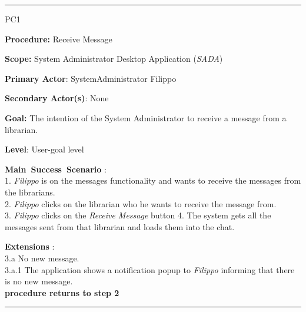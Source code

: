 \vspace{0.5cm}
\hrule
\begin{lyxlist}{PC1}
\small{
\item [\textbf{Procedure:}] Receive Message
\item [\textbf{Scope:}] System Administrator Desktop Application (\emph{SADA})
\item [\textbf{Primary Actor}:] SystemAdministrator Filippo
\item [\textbf{Secondary Actor(s)}:] None
\item [\textbf{Goal:}] The intention of the System Administrator to receive a
message from a librarian.
\item [\textbf{Level}:] User-goal level
\item [\textbf{Main~Success~Scenario}]:\\
1. \emph{Filippo} is on the messages functionality and wants to receive the
messages from the librarians. 
\\
2. \emph{Filippo} clicks on the librarian who he wants to receive the message
from.
\\
3. \emph{Filippo} clicks on the \emph{Receive Message} button
4. The system gets all the messages sent from that librarian and loads them
into the chat.
\\


\item [\textbf{Extensions}]: \\
3.a No new message.\\
\hspace*{0.5cm} 3.a.1 The application shows a notification popup to
\emph{Filippo} informing that there is no new message. \\
\hspace*{0.5cm} \textbf{procedure returns to step 2}
}
\end{lyxlist}
\hrule


